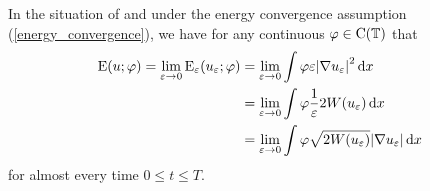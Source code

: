 \begin{lemma}
	\label{equipartition_of_energies_multiphase}
	In the situation of  and under the energy convergence assumption (\ref{energy_convergence}), we have for any continuous $ \varphi \in \operatorname{C} ( \operatorname{\mathbb{T}} ) $ that
	\begin{align*}
		\operatorname{E} ( u ; \varphi )
		=
		\lim_{ \varepsilon \to 0 }
			\operatorname{E}_{ \varepsilon } ( u_{ \varepsilon } ; \varphi )
		& =
		\lim_{ \varepsilon \to 0 }
			\int
				\varphi
				\varepsilon
				\abs{ \nabla u_{ \varepsilon } }^{ 2 }
			\dd{ x }
		\\
		& =
		\lim_{ \varepsilon \to 0 }
			\int
				\varphi
				\frac{ 1 }{ \varepsilon } 2 W ( u_{ \varepsilon } )
			\dd{ x }
		\\
		& =
		\lim_{ \varepsilon \to 0 }
			\int
				\varphi
				\sqrt{ 2 W ( u_{ \varepsilon } ) }
				\abs{ \nabla u_{ \varepsilon } }
			\dd{ x }
	\end{align*}
	for almost every time $ 0 \leq t \leq T $.
\end{lemma}

 